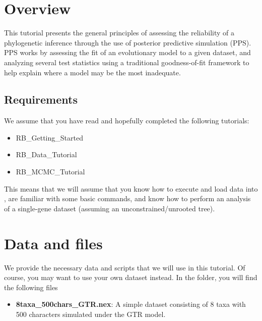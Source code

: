 \newcommand{\sur}[1]{\ensuremath{^{\textrm{#1}}}}
\newcommand{\sous}[1]{\ensuremath{_{\textrm{#1}}}}
\newenvironment{Snugshade}[1][236,236,236]{
  \definecolor{shadecolor}{RGB}{#1}%
  \begin{snugshade}%
}{%
    \end{snugshade}%
}
\section{Overview}


This tutorial presents the general principles of assessing the reliability of a phylogenetic inference through the use
of posterior predictive simulation (PPS). PPS works by assessing the fit of an evolutionary model to a given dataset,
and analyzing several test statistics using a traditional goodness-of-fit framework to help explain where a model
may be the most inadequate. 

\subsection{Requirements}
We assume that you have read and hopefully completed the following tutorials:
\begin{itemize}
\item RB\_Getting\_Started
\item RB\_Data\_Tutorial
\item RB\_MCMC\_Tutorial
\end{itemize}
This means that we will assume that you know how to execute and load data into \RevBayes, are familiar 
with some basic commands, and know how to perform an analysis of a single-gene dataset (assuming an 
unconstrained/unrooted tree).


\section{Data and files}

We provide the necessary data and scripts that we will use in this tutorial.
Of course, you may want to use your own dataset instead.
In the  folder, you will find the following files
\begin{itemize}
\item \textbf{8taxa\_500chars\_GTR.nex}: A simple dataset consisting of 8 taxa with 500 characters simulated under the GTR model.
\end{itemize}

